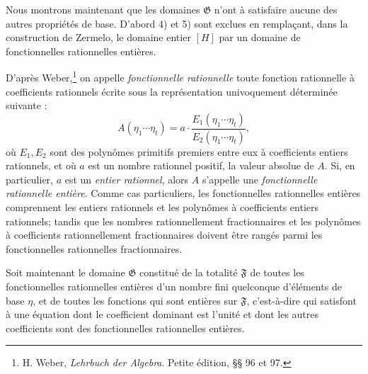 Nous montrons maintenant que les domaines $\mathfrak G$ n'ont à satisfaire aucune des autres propriétés de base. D'abord 4) et 5) sont exclues en remplaçant, dans la construction de Zermelo, le domaine entier $[H]$ par un domaine de \og{} fonctionnelles \fg{} rationnelles entières.

D'après Weber,\footnote{H. Weber, \emph{Lehrbuch der Algebra}. Petite édition, \S{}\S{} 96 et 97.} on appelle \emph{fonctionnelle rationnelle} toute fonction rationnelle à coefficients rationnels écrite sous la représentation univoquement déterminée suivante :
\[
 A(\eta_1\cdots \eta_t)
   = a\cdot\frac{E_1(\eta_1\cdots \eta_t)}{E_2(\eta_1\cdots \eta_t)},
\]
où $E_1,E_2$ sont des polynômes primitifs premiers entre eux à coefficients entiers rationnels, et où $a$ est un nombre rationnel positif, la valeur absolue de $A$. Si, en particulier, $a$ est un \emph{entier rationnel}, alors $A$ s'appelle une \emph{fonctionnelle rationnelle entière}. Comme cas particuliers, les fonctionnelles rationnelles entières comprennent les entiers rationnels et les polynômes à coefficients entiers rationnels; tandis que les nombres rationnellement fractionnaires et les polynômes à coefficients rationnellement fractionnaires doivent être rangés parmi les fonctionnelles rationnelles fractionnaires.

Soit maintenant le domaine $\mathfrak G$ constitué de la totalité $\mathfrak F$ de toutes les fonctionnelles rationnelles entières d'un nombre fini quelconque d'éléments de base $\eta$, et de toutes les fonctions qui sont entières sur $\mathfrak F$, c'est-à-dire qui satisfont à une équation dont le coefficient dominant est l'unité et dont les autres coefficients sont des fonctionnelles rationnelles entières.

